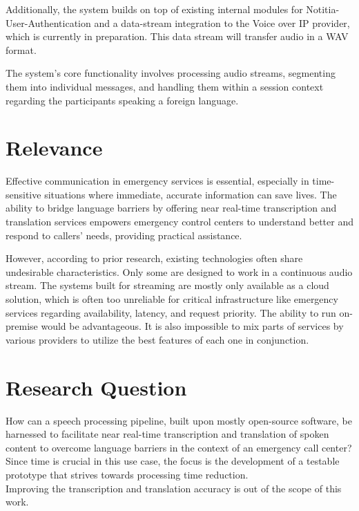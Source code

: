 \documentclass[a4paper,10pt]{article}
\begin{document}
Additionally, the system builds on top of existing internal modules for Notitia-User-Authentication and a data-stream integration to the Voice over IP provider, which is currently in preparation.
This data stream will transfer audio in a WAV format.

The system's core functionality involves processing audio streams, segmenting them into individual messages, and handling them within a session context regarding the participants speaking a foreign language.



\section{Relevance}
Effective communication in emergency services is essential, especially in time-sensitive situations where immediate, accurate information can save lives.
The ability to bridge language barriers by offering near real-time transcription and translation services empowers emergency control centers to understand better and respond to callers' needs, providing practical assistance.

However, according to prior research, existing technologies often share undesirable characteristics.
Only some are designed to work in a continuous audio stream.
The systems built for streaming are mostly only available as a cloud solution, which is often too unreliable for critical infrastructure like emergency services regarding availability, latency, and request priority.
The ability to run on-premise would be advantageous.
It is also impossible to mix parts of services by various providers to utilize the best features of each one in conjunction.



\section{Research Question}
How can a speech processing pipeline, built upon mostly open-source software, be harnessed to facilitate near real-time transcription and translation of spoken content to overcome language barriers in the context of an emergency call center?\\
Since time is crucial in this use case, the focus is the development of a testable prototype that strives towards processing time reduction.\\
Improving the transcription and translation accuracy is out of the scope of this work.
\end{document}
